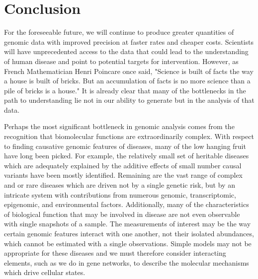 \chapter{Conclusion}
\label{conclusion}

For the foreseeable future, we will continue to produce greater quantities of genomic data with improved precision at faster rates and cheaper costs.  Scientists will have unprecedented access to the data that could lead to the understanding of human disease and point to potential targets for intervention.  However, as French Mathematician Henri Poincare once said, "Science is built of facts the way a house is built of bricks. But an accumulation of facts is no more science than a pile of bricks is a house." It is already clear that many of the bottlenecks in the path to understanding lie not in our ability to generate but in the analysis of that data.  

Perhaps the most significant bottleneck in genomic analysis comes from the recognition that biomolecular functions are extraordinarily complex.  With respect to finding causative genomic features of diseases, many of the low hanging fruit have long been picked. For example, the relatively small set of heritable diseases which are adequately explained by the additive effects of small number causal variants have been mostly identified.  Remaining are the vast range of complex and or rare diseases which are driven not by a single genetic risk, but by an intricate system with contributions from numerous genomic, transcriptomic, epigenomic, and environmental factors. Additionally, many of the characteristics of biological function that may be involved in disease are not even observable with single snapshots of a sample.  The measurements of interest may be the way certain genomic features interact with one another, not their isolated abundances, which cannot be estimated with a single observations. Simple models may not be appropriate for these diseases and we must therefore consider interacting elements, such as we do in gene networks, to describe the molecular mechanisms which drive cellular states. 

